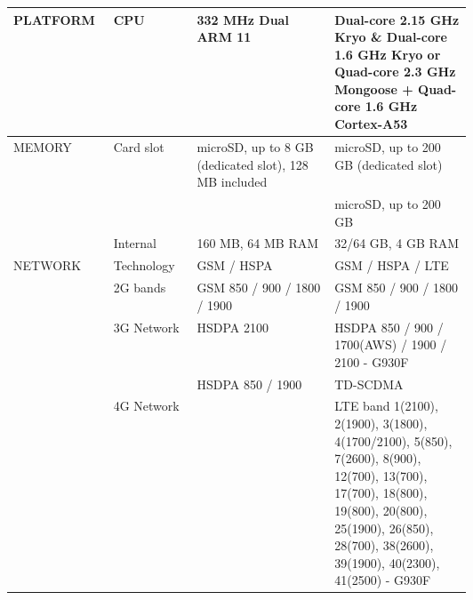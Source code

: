 \begin{longtable}{llp{0.3\linewidth}p{0.3\linewidth}}
PLATFORM & CPU           & 332 MHz Dual ARM 11                                          & Dual-core 2.15 GHz Kryo \& Dual-core 1.6 GHz Kryo or Quad-core 2.3 GHz Mongoose + Quad-core 1.6 GHz Cortex-A53                                                                                                                                                           \\ \hline
MEMORY   & Card slot     & microSD, up to 8 GB (dedicated slot), 128 MB included        & microSD, up to 200 GB (dedicated slot)                                                                                                                                                \\
         &               &                                                              & microSD, up to 200 GB                                                                                                                                                   \\
         & Internal      & 160 MB, 64 MB RAM                                            & 32/64 GB, 4 GB RAM                                                                                                                                                                                          \\ \hline
NETWORK  & Technology    & GSM / HSPA                                                   & GSM / HSPA / LTE                                                                                                                                                                                            \\
         & 2G bands      & GSM 850 / 900 / 1800 / 1900                                  & GSM 850 / 900 / 1800 / 1900                            \\
         & 3G Network    & HSDPA 2100                                                   & HSDPA 850 / 900 / 1700(AWS) / 1900 / 2100 - G930F                                                                                                                                                           \\
         &               & HSDPA 850 / 1900                          & TD-SCDMA                                                                                                                                                                                                    \\
         & 4G Network    &                                                              & LTE band 1(2100), 2(1900), 3(1800), 4(1700/2100), 5(850), 7(2600), 8(900), 12(700), 13(700), 17(700), 18(800), 19(800), 20(800), 25(1900), 26(850), 28(700), 38(2600), 39(1900), 40(2300), 41(2500) - G930F \\

\end{longtable}
